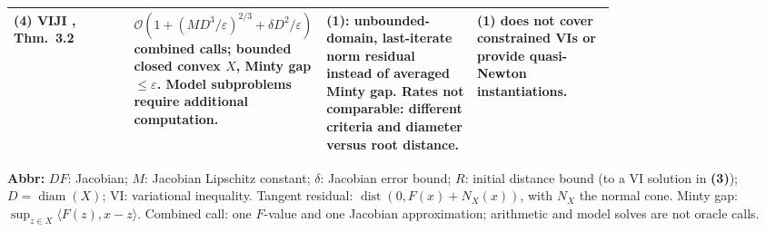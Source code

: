 \begin{table}[tp]
\begin{threeparttable}
\begin{tabularx}{\linewidth}{@{}>{\raggedright\arraybackslash}p{0.20\linewidth}>{\raggedright\arraybackslash}p{0.32\linewidth}>{\raggedright\arraybackslash}p{0.25\linewidth}>{\raggedright\arraybackslash}X@{}}
\midrule
\textbf{(4)} VIJI \citep{ijmAgafonov2024v2}, Thm.~3.2 & $\mathcal{O}(1+(MD^3/\varepsilon)^{2/3}+\delta D^2/\varepsilon)$ combined calls; bounded closed convex $X$, Minty gap $\le\varepsilon$. Model subproblems require additional computation. & \textbf{(1)}: unbounded-domain, last-iterate norm residual instead of averaged Minty gap. Rates not comparable: different criteria and diameter versus root distance. & \textbf{(1)} does not cover constrained VIs or provide quasi-Newton instantiations. \\
\bottomrule
\end{tabularx}
\begin{tablenotes}[flushleft]\footnotesize
\item[] \textbf{Abbr:} $DF$: Jacobian; $M$: Jacobian Lipschitz constant; $\delta$: Jacobian error bound; $R$: initial distance bound (to a VI solution in \textbf{(3)}); $D=\operatorname{diam}(X)$; VI: variational inequality. Tangent residual: $\operatorname{dist}(0,F(x)+N_X(x))$, with $N_X$ the normal cone. Minty gap: $\sup_{z\in X}\langle F(z),x-z\rangle$. Combined call: one $F$-value and one Jacobian approximation; arithmetic and model solves are not oracle calls.
\end{tablenotes}
\end{threeparttable}
\end{table}
\clearpage
